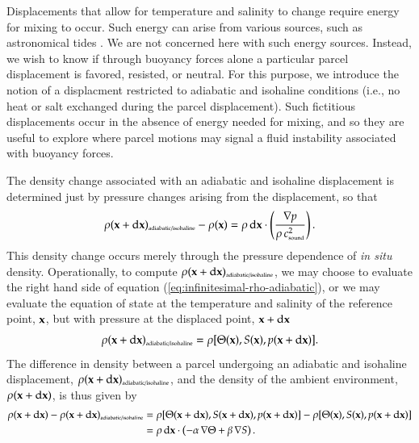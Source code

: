 Displacements that allow for temperature and salinity to change
require energy for mixing to occur.  Such energy can arise from
various sources, such as astronomical tides \citep{MunkWunsch98}. We
are not concerned here with such energy sources.  Instead, we wish to
know if through buoyancy forces alone a particular parcel displacement
is favored, resisted, or neutral.  For this purpose, we introduce the
notion of a displacment restricted to adiabatic and isohaline
conditions (i.e., no heat or salt exchanged during the parcel
displacement).  Such fictitious displacements occur in the absence of
energy needed for mixing, and so they are useful to explore where
parcel motions may signal a fluid instability associated with buoyancy
forces.

The density change associated with an adiabatic and isohaline
displacement is determined just by pressure changes arising from the
displacement, so that
\begin{equation}
\rho({\bf x} + \mathrm{d} {\bf x})_{\mbox{\tiny  adiabatic/isohaline}} - \rho({\bf x})  =
  \rho \, \mathrm{d}{\bf x} \cdot  \left( \frac{ \nabla p }{\rho \, c_{\mbox{\tiny sound}}^{2}  } \right).
\label{eq:infinitesimal-rho-adiabatic}
\end{equation}
This density change occurs merely through the pressure dependence of
{\it in situ} density.  Operationally, to compute $\rho({\bf x} +
\mathrm{d} {\bf x})_{\mbox{\tiny adiabatic/isohaline}}$, we may choose
to evaluate the right hand side of equation
(\ref{eq:infinitesimal-rho-adiabatic}), or we may evaluate the
equation of state at the temperature and salinity of the reference
point, ${\bf x}$, but with pressure at the displaced point, ${\bf x} +
\mathrm{d} {\bf x}$
\begin{equation}
  \rho({\bf x} + \mathrm{d} {\bf x})_{\mbox{\tiny adiabatic/isohaline}} 
 = \rho[ \Theta({\bf x}), S({\bf x}), p({\bf x}  + \mathrm{d} {\bf x})]. 
\end{equation}
The difference in density between a parcel undergoing an adiabatic and
isohaline displacement, $\rho({\bf x} + \mathrm{d} {\bf x})_{\mbox{\tiny
    adiabatic/isohaline}}$, and the density of the ambient environment,
$\rho({\bf x} + \mathrm{d} {\bf x})$, is thus given by
\begin{equation}
\begin{split}
\rho({\bf x} + \mathrm{d} {\bf x})  - \rho({\bf x} + \mathrm{d} {\bf x})_{\mbox{\tiny  adiabatic/isohaline}} 
&=
\rho[ \Theta({\bf x} + \mathrm{d} {\bf x}), S({\bf x} + \mathrm{d} {\bf x}), p({\bf x} + \mathrm{d} {\bf x})]
-
\rho[ \Theta({\bf x} ), S({\bf x}), p({\bf x} + \mathrm{d} {\bf x})]
\\
&= 
  \rho \, \mathrm{d}{\bf x} \cdot 
  \left( -\alpha \, \nabla \Theta + \beta \, \nabla  S \right).
\end{split}
\label{eq:neutral-directions-motivated}
\end{equation}
